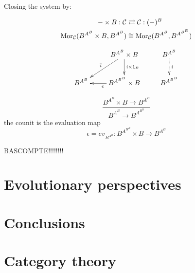 \documentclass[aps,twocolumn]{revtex4-1}
\begin{document}
	\begin{prooftree}
											
				\end{prooftree}

Closing the system by:

\begin{align*}
- \times B: \mathcal{C} & \rightleftarrows \mathcal{C}: (-)^B\\
\Mor_{\mathcal{C}}(B^{A^B} \times B, B^{A^B}) & \cong  \Mor_{\mathcal{C}}(B^{A^B}, B^{A^{B^B}})
\end{align*}

			$$
			\xymatrix{
			& B^{A^B} \times B \ar[d]^-{i \times 1_B} \ar[dl]_{\bar{i}} & B^{A^B} \ar@{.>}[d]^-{i}\\
			B^{A^B} & B^{A^{B^B}} \times B \ar[l]^{\epsilon} & B^{A^{B^B}}
			}
			$$
	
		$$
			\frac{B^{A^B} \times B \longrightarrow B^{A^B}}{B^{A^B} \longrightarrow B^{A^{B^B}}}
		$$
		the counit is the evaluation map
		$$
			\epsilon = ev_{B^{A^B}} \colon B^{A^{B^B}} \times B \longrightarrow B^{A^B}
		$$
	


BASCOMPTE!!!!!!!!

	
\section{Evolutionary perspectives}

\section{Conclusions}


 



\appendix

\section{Category theory}\label{app:CatTh}


%
\end{document}
